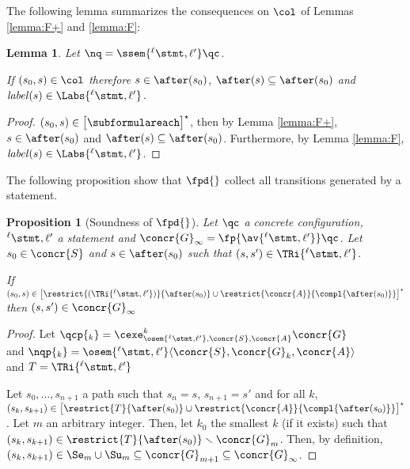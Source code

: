 \documentclass[12pt]{article}
\let\firstunion\cup
\let\cup\firstunion
\renewcommand{\subset}{\subseteq}
\newcommand{\lab}{  {}^{\ell}}
\newcommand{\lbl}{\mathit{label}}
\newtheorem{proposition}{Proposition}
\newtheorem{lemma}{Lemma}
\begin{document}
The following lemma summarizes the consequences on \(\col\) of Lemmas \ref{lemma:F+} and \ref{lemma:F}:

\begin{lemma}\label{lemma:R} Let \(\nq = \ssem{\lab\stmt,\ell'}\qc\).

If \((s_0,s)\in\col\) therefore \(s\in\after(s_0)\), \(\after(s)\subset\after(s_0)\) and \(\lbl(s)\in\Labs{\lab\stmt,\ell'}\). 
\end{lemma}
\begin{proof}
 \((s_0,s)\in\big[\subformulareach\big]^{\star} \), then by Lemma \ref{lemma:F+}, \(s\in\after(s_0)\) and  \(\after(s)\subset\after(s_0)\). Furthermore, by Lemma \ref{lemma:F}, \(\lbl(s)\in\Labs{\lab\stmt,\ell'}\). 
\end{proof}





The following proposition show that \(\fpd{}\) collect all transitions generated by a statement.

\begin{proposition}[Soundness of \(\fpd{}\)]\label{proposition:guarantee}
 Let \(\qc\) a concrete configuration, \(\lab \stmt,\ell'\) a statement and  
 \(\concr{G}_{\infty} = \fp{\av{\lab \stmt,\ell'}}\qc\).
 Let \(s_0\in\concr{S}\) and \(s\in\after(s_0)\) such that \((s,s')\in \TRi{\lab \stmt,\ell'}\).
 
 If \((s_0,s)\in  \big[
\restrict{(\TRi{\lab \stmt,\ell'})}{\after(s_0)}\cup \restrict{\concr{A}}{\compl{\after(s_0)}}
\big]^{\star}\) 
then \((s,s') \in \concr{G}_{\infty}\)
\end{proposition}

\begin{proof}
Let \(\qcp{_k} = \cexe_{\osem{\lab \stmt ,\ell'},\concr{S},\concr{A}}^k \concr{G}\)\\
and \(\nqp{_{k}} = \osem{\lab \stmt ,\ell'} \langle \concr{S} , \concr{G}_k , \concr{A}  \rangle \) \\
and \(T= \TRi{\lab \stmt,\ell'}\)

Let \(s_0,\ldots,s_{n+1}\) a path such that \(s_n=s\), \(s_{n+1}=s'\) and for all \(k\), \((s_k,s_{k+1}) \in \big[\restrict{T}{\after(s_0)}\cup \restrict{\concr{A}}{\compl{\after(s_0)}}
\big]^{\star}\).
Let \(m\) an arbitrary integer.
Then, let \(k_0\) the smallest \(k\) (if it exists) such that \((s_{k},s_{k+1}) \in \restrict{T}{\after(s_0)}\smallsetminus \concr{G}_{m} \).
Then, by definition, \((s_{k},s_{k+1})\in \Se_{m}\cup\Su_{m}\subset \concr{G}_{m+1}\subset\concr{G}_{\infty}\).
\end{proof}
\end{document}
